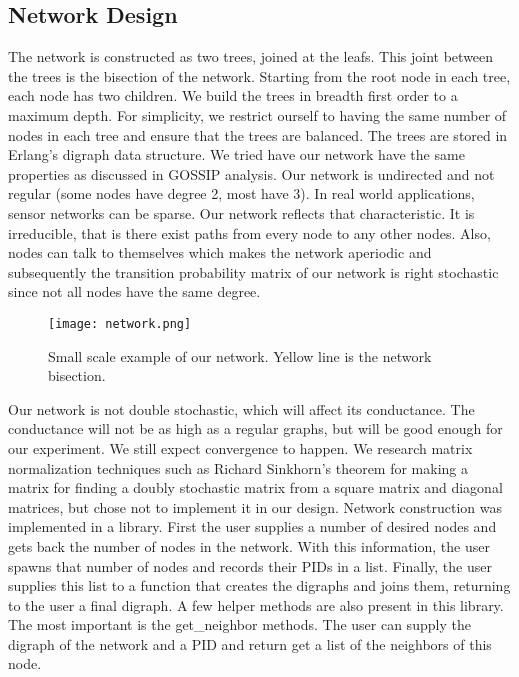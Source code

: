 \subsection{Network Design}
The network is constructed as two trees, joined at the leafs. This joint between the trees is the bisection of the network. Starting from the root node in each tree, each node has two children. We build the trees in breadth first order to a maximum depth. For simplicity, we restrict ourself to having the same number of nodes in each tree and ensure that the trees are balanced. The trees are stored in Erlang’s digraph data structure. We tried have our network have the same properties as discussed in GOSSIP analysis. Our network is undirected and not regular (some nodes have degree 2, most have 3). In real world applications, sensor networks can be sparse. Our network reflects that characteristic. It is irreducible, that is there exist paths
from every node to any other nodes. Also, nodes can talk to themselves which makes the network aperiodic and subsequently the transition probability matrix of our network is right stochastic since not all nodes have the same degree.

\begin{figure}[ht!]
\centering
\texttt{[image: network.png]}
\caption{Small scale example of our network. Yellow line is the network bisection.}
\label{overflow}
\end{figure}

Our network is not double stochastic, which will affect its conductance. The conductance will not be as high as a regular graphs, but will be good enough for our experiment. We still expect convergence to happen. We research matrix normalization techniques such as Richard Sinkhorn's theorem for making a matrix for finding a doubly stochastic matrix from a square matrix and diagonal matrices, but chose not to implement it in our design.
Network construction was implemented in a library. First the user supplies a number of desired nodes and gets back the number of nodes in the network. With this information, the user spawns that number of nodes and records their PIDs in a list. Finally, the user supplies this list to a function that creates the digraphs and joins them, returning to the user a final digraph. A few helper methods are also present in this library. The most important is the get\_neighbor methods. The user can supply the digraph of the network and a PID and return get a list of the neighbors of this node. 

